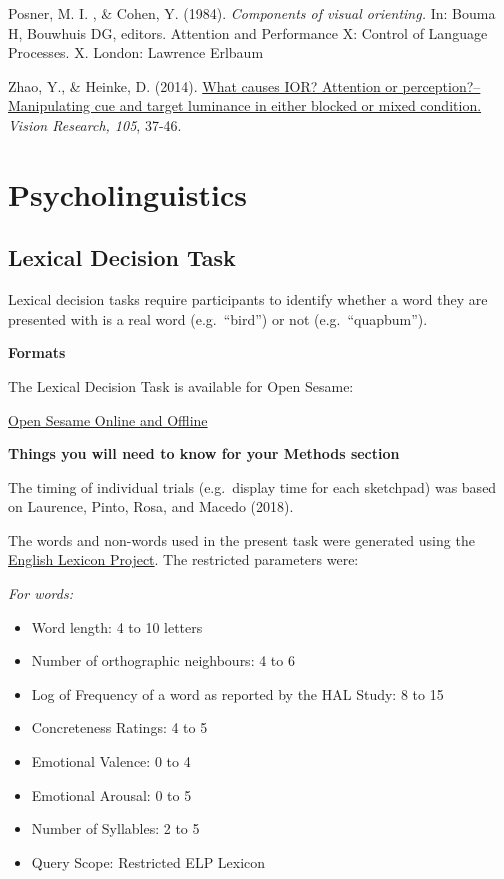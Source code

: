 \documentclass[
]{book}
\providecommand{\tightlist}{%
  \setlength{\itemsep}{0pt}\setlength{\parskip}{0pt}}
\begin{document}
Posner, M. I. , \& Cohen, Y. (1984). \emph{Components of visual orienting.} In: Bouma H, Bouwhuis DG, editors. Attention and Performance X: Control of Language Processes. X. London: Lawrence Erlbaum

Zhao, Y., \& Heinke, D. (2014). \href{https://core.ac.uk/download/pdf/185482615.pdf}{What causes IOR? Attention or perception?--Manipulating cue and target luminance in either blocked or mixed condition.} \emph{Vision Research, 105}, 37-46.

\hypertarget{psycholinguistics}{%
\chapter{Psycholinguistics}\label{psycholinguistics}}

\hypertarget{lexical-decision-task}{%
\section{Lexical Decision Task}\label{lexical-decision-task}}

Lexical decision tasks require participants to identify whether a word they are presented with is a real word (e.g.~``bird'') or not (e.g.~``quapbum'').

\textbf{Formats}

The Lexical Decision Task is available for Open Sesame:

\href{link\%20here}{Open Sesame Online and Offline}

\textbf{Things you will need to know for your Methods section}

The timing of individual trials (e.g.~display time for each sketchpad) was based on Laurence, Pinto, Rosa, and Macedo (2018).

The words and non-words used in the present task were generated using the \href{https://elexicon.wustl.edu/}{English Lexicon Project}. The restricted parameters were:

\emph{For words:}

\begin{itemize}
\tightlist
\item
  Word length: 4 to 10 letters
\item
  Number of orthographic neighbours: 4 to 6
\item
  Log of Frequency of a word as reported by the HAL Study: 8 to 15
\item
  Concreteness Ratings: 4 to 5
\item
  Emotional Valence: 0 to 4
\item
  Emotional Arousal: 0 to 5
\item
  Number of Syllables: 2 to 5
\item
  Query Scope: Restricted ELP Lexicon
\end{itemize}
\end{document}
